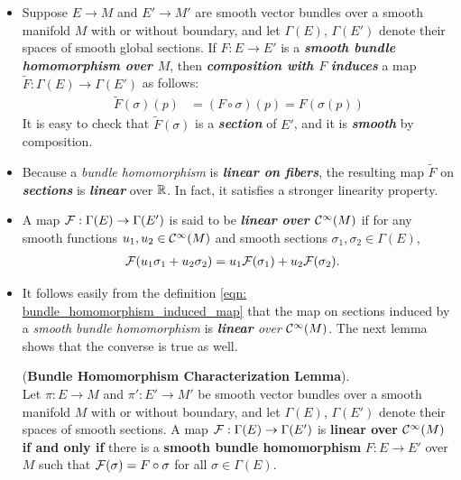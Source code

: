 \documentclass[11pt]{article}
\begin{document}
\begin{itemize}
\item \begin{definition}
Suppose $E \rightarrow M$ and $E' \rightarrow M'$ are smooth vector bundles over a smooth manifold $M$ with or without boundary, and let $\Gamma(E)$, $\Gamma(E')$ denote their spaces of smooth global sections. If $F: E \rightarrow E'$ is a \emph{\textbf{smooth bundle homomorphism over $M$}}, then \emph{\textbf{composition with $F$}} \textit{\textbf{induces}} a map $\widetilde{F}: \Gamma(E) \rightarrow \Gamma(E')$ as follows:
\begin{align}
\widetilde{F}(\sigma)(p) &= (F \circ \sigma)(p) = F(\sigma(p)) \label{eqn: bundle_homomorphism_induced_map}
\end{align}
It is easy to check that $\widetilde{F}(\sigma)$ is a \emph{\textbf{section}} of $E'$, and it is \emph{\textbf{smooth}} by composition.
\end{definition}

\item \begin{remark}
Because a \emph{bundle homomorphism} is \emph{\textbf{linear on fibers}}, the resulting map $\widetilde{F}$ on \emph{\textbf{sections}} is \emph{\textbf{linear}} over ${\mathbb R}$. In fact, it satisfies a stronger linearity property.
\end{remark}

\item \begin{definition}
A map ${\mathcal F}: \Gamma(E) \rightarrow \Gamma(E')$ is said to be \emph{\textbf{linear over ${\mathcal C}^{\infty}(M)$}} if for any smooth functions $u_1,u_2 \in {\mathcal C}^{\infty}(M)$ and smooth sections $\sigma_1, \sigma_2 \in \Gamma(E)$,
\begin{align*}
{\mathcal F}(u_1\sigma_1 + u_2\sigma_2) &= u_1 {\mathcal F}(\sigma_1) + u_2{\mathcal F}(\sigma_2).
\end{align*}
\end{definition}


\item It follows easily from the definition \eqref{eqn: bundle_homomorphism_induced_map} that the map on sections induced by a \emph{smooth bundle homomorphism} is \emph{\textbf{linear} over ${\mathcal C}^{\infty}(M)$}. The next lemma shows that the converse is true as well.
\begin{lemma} (\textbf{Bundle Homomorphism Characterization Lemma}). \citep{lee2003introduction}\\
Let $\pi: E \rightarrow M$ and $\pi': E' \rightarrow M'$ be smooth vector bundles over a smooth manifold $M$ with or without boundary, and let $\Gamma(E)$, $\Gamma(E')$ denote their spaces of smooth sections. A map ${\mathcal F}: \Gamma(E) \rightarrow \Gamma(E')$ is \textbf{linear over ${\mathcal C}^{\infty}(M)$} \textbf{if and only if} there is a \textbf{smooth bundle homomorphism} $F: E \rightarrow E'$ over $M$ such that ${\mathcal F}(\sigma) = F\circ \sigma$ for all $\sigma \in \Gamma(E)$.
\end{lemma}


\end{itemize}
\end{document}
